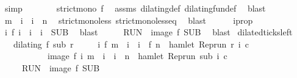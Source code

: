 \begin{isabellebody}
\ simp\isanewline
\ \ \ \ \isamarkupfalse%
\ \isamarkupfalse%
\ {\isacartoucheopen}strict{\isacharunderscore}mono\ f{\isacartoucheclose}\ \isamarkupfalse%
\ assms\ dilating{\isacharunderscore}def\ dilating{\isacharunderscore}fun{\isacharunderscore}def\ \isamarkupfalse%
\ blast\isanewline
\ \ \ \ \isamarkupfalse%
\ \isamarkupfalse%
\ {\isacartoucheopen}m\ {\isacharless}\ i\ {\isasymand}\ i\ {\isacharless}\ n{\isacartoucheclose}\ \isamarkupfalse%
\ strict{\isacharunderscore}mono{\isacharunderscore}less\ strict{\isacharunderscore}mono{\isacharunderscore}less{\isacharunderscore}eq\ \isamarkupfalse%
\ blast\isanewline
\ \ \ \ \isamarkupfalse%
\ i{}prop\ \isamarkupfalse%
\ {\isacartoucheopen}{\isasymexists}i\ f\ i\ {\isacharequal}\ i\ {\isasymand}\ i\ {\isasymin}\ {\isacharquery}SUB{\isacartoucheclose}\ \isamarkupfalse%
\ blast\isanewline
\ \ \isacommand{{\isacharbraceright}}\isamarkupfalse%
\ \isamarkupfalse%
\ {\isacartoucheopen}{\isacharquery}RUN\ {\isasymsubseteq}\ image\ f\ {\isacharquery}SUB{\isacartoucheclose}\ \isamarkupfalse%
\ blast\isanewline
{}\isamarkupfalse%
%
\endisatagproof
{\isafoldproof}%
%
\isadelimproof
\isanewline
%
\endisadelimproof
\isanewline
{}\isamarkupfalse%
\ dilated{\isacharunderscore}ticks{\isacharunderscore}left{\isacharcolon}\isanewline
\ \ \ {\isacartoucheopen}dilating\ f\ sub\ r{\isacartoucheclose}\isanewline
\ \ \ \ \ {\isacartoucheopen}{\isacharbraceleft}i{\isachardot}\ f\ m\ {\isasymle}\ i\ {\isasymand}\ i\ {\isacharless}\ f\ n\ {\isasymand}\ hamlet\ {\isacharparenleft}{\isacharparenleft}Rep{\isacharunderscore}run\ r{\isacharparenright}\ i\ c{\isacharparenright}{\isacharbraceright}\isanewline
\ \ \ \ \ \ \ \ \ \ {\isacharequal}\ image\ f\ {\isacharbraceleft}i{\isachardot}\ m\ {\isasymle}\ i\ {\isasymand}\ i\ {\isacharless}\ n\ {\isasymand}\ hamlet\ {\isacharparenleft}{\isacharparenleft}Rep{\isacharunderscore}run\ sub{\isacharparenright}\ i\ c{\isacharparenright}{\isacharbraceright}{\isacartoucheclose}\isanewline
\ \ \ \ {\isacharparenleft}\ {\isacartoucheopen}{\isacharquery}RUN\ {\isacharequal}\ image\ f\ {\isacharquery}SUB{\isacartoucheclose}{\isacharparenright}\isanewline

\end{isabellebody}
